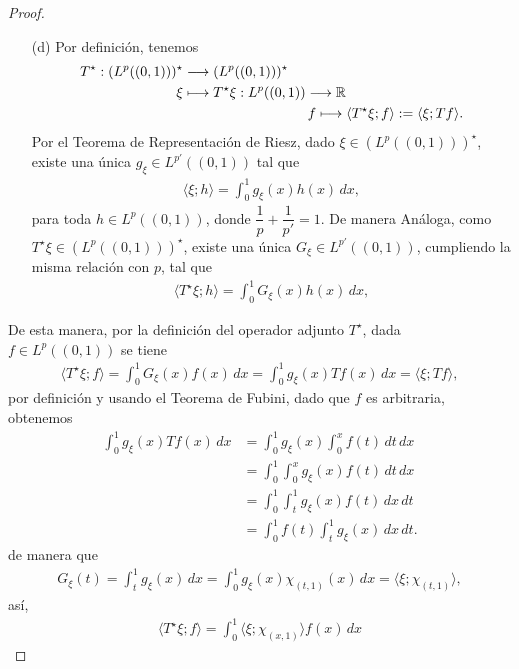 \begin{proof}
\begin{enumerate}
        \item[(d)] Por definición, tenemos
        \begin{align*}
            T^\star: (L^p((0,1)))^\star &\longrightarrow (L^p((0,1)))^\star\\
            \xi &\longmapsto T^\star\xi: L^p((0,1)) \longrightarrow \mathbb{R}\\
            & \hspace{31.5mm} f \longmapsto \langle T^\star\xi; f\rangle:=\langle \xi;Tf\rangle. 
        \end{align*}
        Por el Teorema de Representación de Riesz, dado $\xi \in (L^p((0,1)))^\star$, existe una única $g_\xi \in L^{p'}((0,1))$ tal que 
        \begin{align*}
            \langle \xi;h\rangle=\int_0^1 g_\xi(x)h(x)\, dx,
        \end{align*}
        para toda $h \in L^p((0,1))$, donde $\dfrac{1}{p}+\dfrac{1}{p'}=1$. De manera Análoga, como\\ $T^\star \xi \in (L^p((0,1)))^\star$, existe una única $G_\xi\in L^{p'}((0,1))$, cumpliendo la misma relación con $p$, tal que 
        \begin{align*}
            \langle T^\star \xi;h\rangle=\int_0^1 G_\xi(x)h(x)\, dx,
        \end{align*}
    \end{enumerate}
    De esta manera, por la definición del operador adjunto $T^\star$, dada $f \in L^p((0,1))$ se tiene
    \begin{align*}
        \langle T^\star \xi;f\rangle=\int_{0}^1G_\xi(x)f(x)\, dx=\int_0^1 g_\xi(x)Tf(x)\, dx=\langle \xi;Tf\rangle,
    \end{align*}
    por definición y usando el Teorema de Fubini, dado que $f$ es arbitraria, obtenemos
    \begin{align*}
        \int_0^1 g_\xi(x)Tf(x)\, dx&=\int_0^1 g_\xi(x)\int_0^x f(t)\, dt\, dx\\
        &=\int_0^1 \int_0^x g_\xi(x)f(t)\, dt\, dx\\
        &=\int_0^1 \int_t^1 g_\xi(x)f(t)\, dx\, dt\\
        &=\int_0^1f(t)\int_{t}^1g_\xi(x)\, dx\, dt.
    \end{align*}
    de manera que
    \begin{align*}
        G_\xi(t)=\int_t^1 g_\xi(x)\, dx=\int_{0}^1 g_{\xi}(x)\chi_{(t,1)}(x)\, dx=\langle \xi;\chi_{(t,1)}\rangle,
    \end{align*}
    así, 
    \begin{align*}
        \langle T^\star \xi;f\rangle=\int_0^1 \langle \xi;\chi_{(x,1)}\rangle f(x)\, dx
    \end{align*}
\end{proof}

